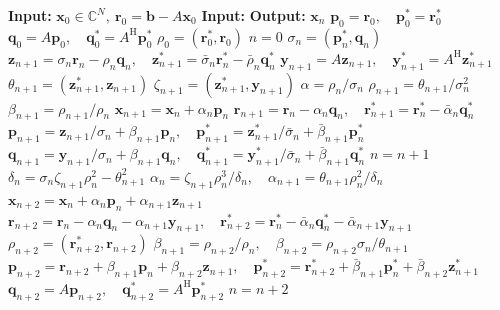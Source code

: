 \begin{algorithm}[H]\caption{}\label{alg:composite-step-bicg}\begin{algorithmic}[1]
\Statex\textbf{Input:} $\bm x_0\in\mathbb C^N,\ \bm r_0=\bm b-A\bm x_0$
\Statex\textbf{Input:} 
\Statex\textbf{Output:} $\bm x_n$
\State $\bm p_0=\bm r_0,\quad\bm p_0^{*}=\bm r_0^{*}$
\State $\bm q_0=A\bm p_0,\quad\bm q_0^{*}=A^{\mathrm H}\bm p_0^{*}$
\State $\rho_0=(\bm r_0^{*},\bm r_0)$
\State $n=0$
\State $\sigma_n=(\bm p_n^{*},\bm q_n)$
\State $\bm z_{n+1}=\sigma_n\bm r_n-\rho_n\bm q_n,\quad\bm z_{n+1}^{*}=\bar\sigma_n\bm r_n^{*}-\bar\rho_n\bm q_n^{*}$
\State $\bm y_{n+1}=A\bm z_{n+1},\quad\bm y_{n+1}^{*}=A^{\mathrm H}\bm z_{n+1}^{*}$
\State $\theta_{n+1}=(\bm z_{n+1}^{*},\bm z_{n+1})$
\State $\zeta_{n+1}=(\bm z_{n+1}^{*},\bm y_{n+1})$
\State $\alpha=\rho_n/\sigma_n$
\State $\rho_{n+1}=\theta_{n+1}/\sigma_n^2$
\State $\beta_{n+1}=\rho_{n+1}/\rho_n$
\State $\bm x_{n+1}=\bm x_n+\alpha_n\bm p_n$
\State $\bm r_{n+1}=\bm r_n-\alpha_n\bm q_n,\quad\bm r_{n+1}^{*}=\bm r_n^{*}-\bar\alpha_n\bm q_n^{*}$
\State $\bm p_{n+1}=\bm z_{n+1}/\sigma_n+\beta_{n+1}\bm p_n,\quad\bm p_{n+1}^{*}=\bm z_{n+1}^{*}/\bar\sigma_n+\bar\beta_{n+1}\bm p_n^{*}$
\State $\bm q_{n+1}=\bm y_{n+1}/\sigma_n+\beta_{n+1}\bm q_n,\quad\bm q_{n+1}^{*}=\bm y_{n+1}^{*}/\bar\sigma_n+\bar\beta_{n+1}\bm q_n^{*}$
\State $n=n+1$
\EndIf
{}
\State $\delta_n=\sigma_n\zeta_{n+1}\rho_n^2-\theta_{n+1}^2$
\State $\alpha_n=\zeta_{n+1}\rho_n^3/\delta_n,\quad\alpha_{n+1}=\theta_{n+1}\rho_n^2/\delta_n$
\State $\bm x_{n+2}=\bm x_n+\alpha_n\bm p_n+\alpha_{n+1}\bm z_{n+1}$
\State $\bm r_{n+2}=\bm r_n-\alpha_n\bm q_n-\alpha_{n+1}\bm y_{n+1},\quad\bm r_{n+2}^{*}=\bm r_n^{*}-\bar\alpha_n\bm q_n^{*}-\bar\alpha_{n+1}\bm y_{n+1}$
\State $\rho_{n+2}=(\bm r_{n+2}^{*},\bm r_{n+2})$
\State $\beta_{n+1}=\rho_{n+2}/\rho_n,\quad\beta_{n+2}=\rho_{n+2}\sigma_n/\theta_{n+1}$
\State $\bm p_{n+2}=\bm r_{n+2}+\beta_{n+1}\bm p_n+\beta_{n+2}\bm z_{n+1},\quad\bm p_{n+2}^{*}=\bm r_{n+2}^{*}+\bar\beta_{n+1}\bm p_n^{*}+\bar\beta_{n+2}\bm z_{n+1}^{*}$
\State $\bm q_{n+2}=A\bm p_{n+2},\quad\bm q_{n+2}^{*}=A^{\mathrm H}\bm p_{n+2}^{*}$
\State $n=n+2$
\EndIf\EndWhile\end{algorithmic}\end{algorithm}
